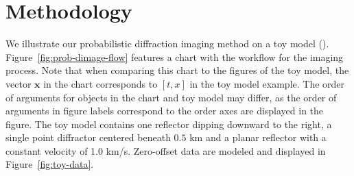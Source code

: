 \section{Methodology}
We illustrate our probabilistic diffraction imaging method on a toy model (\citealp{landa08,klokov3,deckerovc}). Figure~\ref{fig:prob-dimage-flow} features a chart with the workflow for the imaging process.  Note that when comparing this chart to the figures of the toy model, the vector $\mathbf{x}$ in the chart corresponds to $\left[t,x\right]$ in the toy model example.  The order of arguments for objects in the chart and toy model may differ, as the order of arguments in figure labels correspond to the order axes are displayed in the figure.  The toy model contains one reflector dipping downward to the right, a single point diffractor centered beneath $0.5$ km and a planar reflector with a constant velocity of 1.0 km/s.  Zero-offset data are modeled and displayed in Figure~\ref{fig:toy-data}.  




